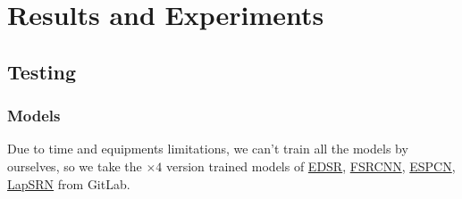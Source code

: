 \documentclass[10pt,twocolumn,letterpaper]{article}
\begin{document}
\section{Results and Experiments}
\subsection{Testing}
\subsubsection*{Models}
Due to time and equipments limitations, we can't train all the models by ourselves, so
we take the $\times 4$ version trained models of 
\href{https://github.com/Saafke/EDSR_Tensorflow/tree/master/models}{EDSR},
\href{https://github.com/Saafke/FSRCNN_Tensorflow/tree/master/models}{FSRCNN},
\href{https://github.com/fannymonori/TF-ESPCN/tree/master/export}{ESPCN},
\href{https://github.com/fannymonori/TF-LapSRN/tree/master/export}{LapSRN} from GitLab.
\end{document}
